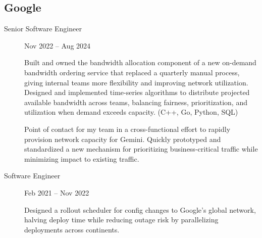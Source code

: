 \documentclass[letterpaper,10pt,oneside]{article}
\begin{document}
\subsection*{Google}
\vspace{-3px}
\begin{description}
	\item[Senior Software Engineer]\hfill Nov 2022 -- Aug 2024

	\noindent\llap{\textbullet\hspace{6pt}}Built and owned the bandwidth allocation component of a new on-demand bandwidth ordering service that replaced a quarterly manual process, giving internal teams more flexibility and improving network utilization. Designed and implemented time-series algorithms to distribute projected available bandwidth across teams, balancing fairness, prioritization, and utilization when demand exceeds capacity. (C++, Go, Python, SQL)

	\vspace{2px}
	\noindent\llap{\textbullet\hspace{6pt}}Point of contact for my team in a cross-functional effort to rapidly provision network capacity for Gemini. Quickly prototyped and standardized a new mechanism for prioritizing business-critical traffic while minimizing impact to existing traffic.

	\item[Software Engineer]\hfill Feb 2021 -- Nov 2022

	\noindent\llap{\textbullet\hspace{6pt}}Designed a rollout scheduler for config changes to Google's global network, halving deploy time while reducing outage risk by parallelizing deployments across continents.

\end{description}
\end{document}
